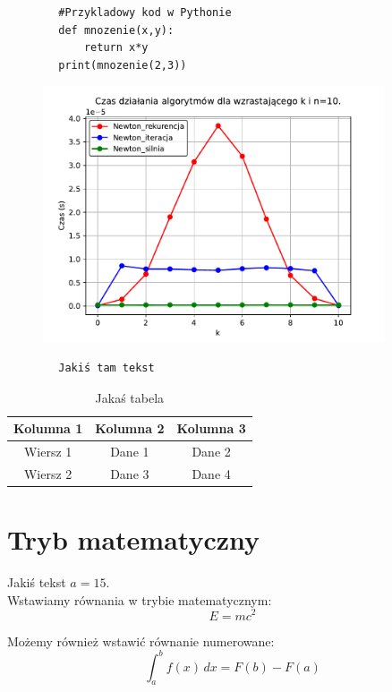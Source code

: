 \documentclass{article}
\theoremstyle{definition}
\begin{document}
	
	\begin{lstlisting}
		#Przykladowy kod w Pythonie
		def mnozenie(x,y):
			return x*y
		print(mnozenie(2,3))
	\end{lstlisting}
	
	\begin{figure}
		\centering
		\includegraphics[width=0.9\textwidth]{Wykres2_1.pdf}
	\end{figure}
	
	\begin{verbatim}
		Jakiś tam tekst
	\end{verbatim}
	
	\begin{table}
		\centering
		\begin{tabular}{|c|c|c|}
			\hline
			Kolumna 1 & Kolumna 2 & Kolumna 3 \\ \hline
			Wiersz 1  & Dane 1    & Dane 2    \\ \hline
			Wiersz 2  & Dane 3    & Dane 4    \\ \hline
		\end{tabular}
		\caption{Jakaś tabela}
	\end{table}
	
	\section{Tryb matematyczny}
	Jakiś tekst $a=15$.\\
	Wstawiamy równania w trybie matematycznym:
	\[
	E = mc^2
	\]
	
	Możemy również wstawić równanie numerowane:
	\begin{equation}\label{całka}
		\int_a^b f(x) \, dx = F(b) - F(a)
	\end{equation}
	
\end{document}
